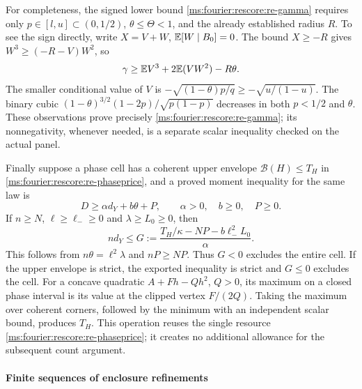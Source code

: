 For completeness, the signed lower bound \eqref{ms:fourier:rescore:re-gamma}
requires only $p\in[l,u]\subset(0,1/2)$, $\theta\le\Theta<1$, and
the already established radius $R$. To see the sign directly, write
$X=V+W$, $\mathbb E[W\mid B_0]=0$. The bound $X\ge-R$ gives
$W^3\ge(-R-V)W^2$, so
\[
 \gamma\ge\mathbb E V^3+2\mathbb E(VW^2)-R\theta.
\]
The smaller conditional value of $V$ is
$-\sqrt{(1-\theta)p/q}\ge-\sqrt{u/(1-u)}$. The binary cubic
$(1-\theta)^{3/2}(1-2p)/\sqrt{p(1-p)}$ decreases in both $p<1/2$
and $\theta$. These observations prove precisely
\eqref{ms:fourier:rescore:re-gamma}; its nonnegativity, whenever needed, is a
separate scalar inequality checked on the actual panel.

Finally suppose a phase cell has a coherent upper envelope
$\mathcal B(H)\le T_H$ in \eqref{ms:fourier:rescore:re-phaseprice}, and a proved
moment inequality for the same law is
\[
 D\ge\alpha d_Y+b\theta+P,\qquad
 \alpha>0,\quad b\ge0,\quad P\ge0.
\]
If $n\ge N$, $\ell\ge\ell_-\ge0$ and $\lambda\ge L_0\ge0$, then
\begin{equation}\label{ms:fourier:rescore:re-localG}
 nd_Y\le G:=
 \frac{T_H/\kappa-NP-b\ell_-^2L_0}{\alpha}.
\end{equation}
This follows from $n\theta=\ell^2\lambda$ and $nP\ge NP$.
Thus $G<0$ excludes the entire cell. If the upper envelope is strict,
the exported inequality is strict and $G\le0$ excludes the cell.
For a concave quadratic $A+Fh-Qh^2$, $Q>0$, its maximum on a closed
phase interval is its value at the clipped vertex $F/(2Q)$. Taking
the maximum over coherent corners, followed by the minimum with an
independent scalar bound, produces $T_H$. This operation reuses the
single resource \eqref{ms:fourier:rescore:re-phaseprice}; it creates no additional
allowance for the subsequent count argument.

\paragraph{Finite sequences of enclosure refinements}\label{ms:fourier:rescore:u-propagation}

